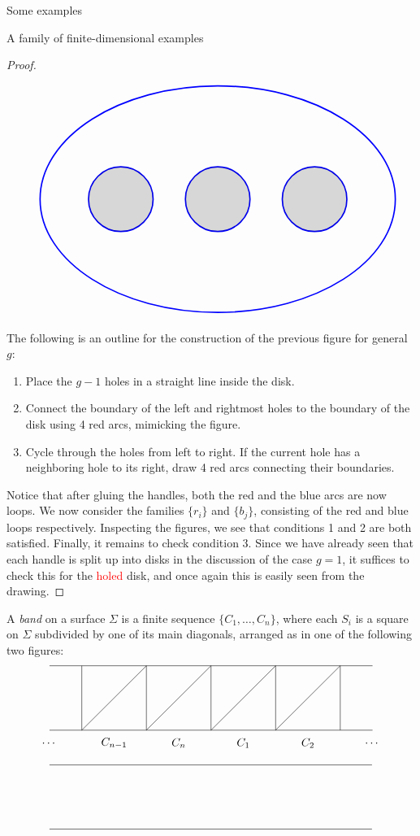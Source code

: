 \begin{chapter}{Some examples}
\begin{section}{A family of finite-dimensional examples}
\begin{proof}
\begin{figure}[h]
\[\begin{tikzpicture}
\draw[blue, very thick] (0,0) ellipse (5.5cm and 3.5cm);
\draw[blue, very thick] (0,0) circle (1cm);
\draw[blue, very thick] (-3,0) circle (1cm);
\draw[blue, very thick] (3,0) circle (1cm);
\fill [black,opacity=.15] (-3,0) circle (1cm);
\fill [black,opacity=.15] (0,0) circle (1cm);
\fill [black,opacity=.15] (3,0) circle (1cm);
\end{tikzpicture}
\]
\end{figure}

The following is an outline for the construction of the previous figure for general $g$:
\begin{enumerate}
\item Place the $g-1$ holes in a straight line inside the disk.
\item Connect the boundary of the left and rightmost holes to the boundary of the disk using 4 red arcs, mimicking the figure.
\item Cycle through the holes from left to right. If the current hole has a neighboring hole to its right, draw 4 red arcs connecting their boundaries.
\end{enumerate}

Notice that after gluing the handles, both the red and the blue arcs are now loops. We now consider the families $\{r_i\}$ and $\{b_j\}$, consisting of the red and blue loops respectively. Inspecting the figures, we see that conditions 1 and 2 are both satisfied. Finally, it remains to check condition 3. Since we have already seen that each handle is split up into disks in the discussion of the case $g=1$, it suffices to check this for the \textcolor{red}{holed} disk, and once again this is easily seen from the drawing.
\end{proof}

A \emph{band} on a surface $\Sigma$ is a finite sequence $\{C_1, \dots, C_n\}$, where each $S_i$ is a square on $\Sigma$ subdivided by one of its main diagonals, arranged as in one of the following two figures:
\[
\begin{tikzpicture}
\draw (-5,1) -- (5,1);
\draw (-5,-1) -- (5,-1);

\foreach \x in {-4,-2,...,4}
\draw (\x,1) -- (\x,-1);

\foreach \x in {-4,-2,...,2}
\draw (\x,-1) -- (\x+2, 1);

\node at (-5,-1.4) {$\dots$};
\node at (-3,-1.4) {$C_{n-1}$};
\node at (-1,-1.4) {$C_{n}$};
\node at (1,-1.4) {$C_{1}$};
\node at (3,-1.4) {$C_{2}$};
\node at (5,-1.4) {$\dots$};
\end{tikzpicture}
\]
\[
\begin{tikzpicture}
\draw (-5,1) -- (5,1);
\draw (-5,-1) -- (5,-1);


\end{tikzpicture}\]
\end{section}
\end{chapter}
